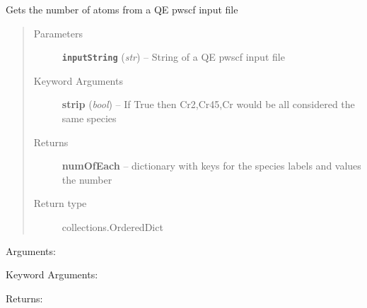 \documentclass[letterpaper,10pt,english]{sphinxmanual}
\begin{document}

\begin{fulllineitems}
\label{retr:retr.__getAtomNum}
Gets the number of atoms from a QE pwscf input file
\begin{quote}\begin{description}
\item[{Parameters}] \leavevmode
\textbf{\texttt{inputString}} (\emph{str}) -- String of a QE pwscf input file

\item[{Keyword Arguments}] \leavevmode
\textbf{strip} (\emph{bool}) --
If True then Cr2,Cr45,Cr would be all considered the same species

\item[{Returns}] \leavevmode
\textbf{numOfEach} --
dictionary with keys for the species labels and values the number

\item[{Return type}] \leavevmode
collections.OrderedDict

\end{description}\end{quote}

\end{fulllineitems}


\begin{fulllineitems}
\label{retr:retr.__getCartConvMatrix}
Arguments:

Keyword Arguments:

Returns:

\end{fulllineitems}

\end{document}
